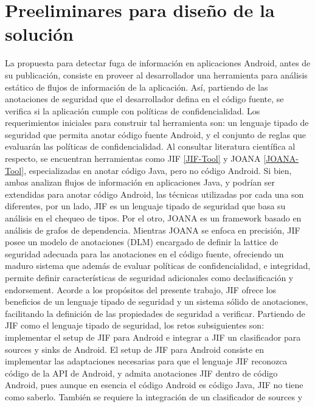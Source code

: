 \section{Preeliminares para diseño de la solución}
\label{sec:propuesta-sol}
La propuesta para detectar fuga de información en aplicaciones Android, antes de
su publicación, consiste en proveer al desarrollador una herramienta para
análisis estático de flujos de información de la aplicación. Así, partiendo de
las anotaciones de seguridad que el desarrollador defina en el código fuente, se
verifica si la aplicación cumple con políticas de confidencialidad.\newline
Los requerimientos iniciales para construir tal herramienta son: un lenguaje
tipado de seguridad que permita anotar código fuente Android, y el conjunto de
reglas que evaluarán las políticas de confidencialidad.\newline 
Al consultar literatura científica al respecto, se encuentran herramientas como
JIF \ref{JIF-Tool} y JOANA \ref{JOANA-Tool}, especializadas en anotar código
Java, pero no código Android.
Si bien, ambas analizan flujos de información en aplicaciones Java, y podrían
ser extendidas para anotar código Android, las técnicas utilizadas por cada una
son diferentes, por un lado, JIF es un lenguaje tipado de seguridad que basa su
análisis en el chequeo de tipos. Por el otro, JOANA es un framework basado en
análisis de grafos de dependencia. Mientras JOANA se enfoca en precisión, JIF
posee un modelo de anotaciones (DLM) encargado de definir la lattice de
seguridad adecuada para las anotaciones en el código fuente, ofreciendo un
maduro sistema que además de evaluar políticas de confidencialidad, e
integridad, permite definir características de seguridad adicionales como
declasificación y endorsement.
Acorde a los propósitos del presente trabajo, JIF ofrece los beneficios de un
lenguaje tipado de seguridad y un sistema  sólido  de anotaciones, facilitando
la definición de las propiedades de seguridad a verificar.\newline 
Partiendo de JIF como el lenguaje tipado de seguridad, los retos subsiguientes
son: implementar el setup de JIF para Android e integrar a JIF un clasificador
para sources y sinks de Android. El setup de JIF para Android consiste en
implementar las adaptaciones necesarias para que el lenguaje JIF reconozca
código de la API de Android, y admita anotaciones JIF dentro de código
Android, pues aunque en esencia el código Android es código Java, JIF no tiene
como saberlo. También se requiere la integración de un clasificador de sources y

